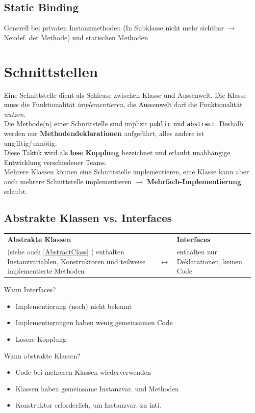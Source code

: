 \subsection{Static Binding}
Generell bei privaten Instanzmethoden (In Subklasse nicht mehr sichtbar $\rightarrow$ Neudef. der Methode) und statischen Methoden

\section{Schnittstellen}
Eine Schnittstelle dient als Schleuse zwischen Klasse und Aussenwelt. Die Klasse muss die Funktionalität \textit{implementieren},
die Aussenwelt darf die Funktionalität \textit{nutzen}.\\
Die Methode(n) einer Schnittstelle sind implizit \verb|public| und \verb|abstract|. Deshalb werden nur \textbf{Methodendeklarationen} aufgeführt,
alles andere ist ungültig/unnötig.\\

Diese Taktik wird als \textbf{lose Kopplung} bezeichnet und erlaubt unabhängige Entwicklung verschiedener Teams.\\

Mehrere Klassen können eine Schnittstelle implementieren, eine Klasse kann aber auch mehrere Schnittstelle implementieren $\rightarrow$
\textbf{Mehrfach-Implementierung} erlaubt.

\subsection{Abstrakte Klassen vs. Interfaces}
\begin{tabularx}{\linewidth}{|X c X|} \hline
    \textbf{Abstrakte Klassen} & & \textbf{Interfaces} \\
    (siehe auch \ref{AbstractClass} ) enthalten Instanzvariablen, Konstruktoren und teilweise implementierte Methoden & $\longleftrightarrow $ & enthalten nur Deklarationen, keinen Code \\
    \hline
\end{tabularx}

Wann Interfaces?
\begin{itemize}
    \item Implementierung (noch) nicht bekannt
    \item Implementierungen haben wenig gemeinsamen Code
    \item Losere Kopplung
\end{itemize}

Wann abstrakte Klassen?
\begin{itemize}
    \item Code bei mehreren Klassen wiederverwenden
    \item Klassen haben gemeinsame Instanzvar. und Methoden
    \item Konstruktor erforderlich, um Instanzvar. zu inti.
\end{itemize}


